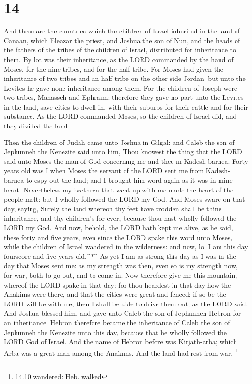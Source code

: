 \hypertarget{section-13}{%
\section{14}\label{section-13}}

 And these are the countries which the children of Israel
inherited in the land of Canaan, which Eleazar the priest, and Joshua
the son of Nun, and the heads of the fathers of the tribes of the
children of Israel, distributed for inheritance to them.  By
lot was their inheritance, as the LORD commanded by the hand of Moses,
for the nine tribes, and for the half tribe.  For Moses had
given the inheritance of two tribes and an half tribe on the other side
Jordan: but unto the Levites he gave none inheritance among them.
 For the children of Joseph were two tribes, Manasseh and
Ephraim: therefore they gave no part unto the Levites in the land, save
cities to dwell in, with their suburbs for their cattle and for their
substance.  As the LORD commanded Moses, so the children of
Israel did, and they divided the land.

 Then the children of Judah came unto Joshua in Gilgal: and
Caleb the son of Jephunneh the Kenezite said unto him, Thou knowest the
thing that the LORD said unto Moses the man of God concerning me and
thee in Kadesh-barnea.  Forty years old was I when Moses the
servant of the LORD sent me from Kadesh-barnea to espy out the land; and
I brought him word again as it was in mine heart. 
Nevertheless my brethren that went up with me made the heart of the
people melt: but I wholly followed the LORD my God.  And
Moses sware on that day, saying, Surely the land whereon thy feet have
trodden shall be thine inheritance, and thy children's for ever, because
thou hast wholly followed the LORD my God.  And now,
behold, the LORD hath kept me alive, as he said, these forty and five
years, even since the LORD spake this word unto Moses, while the
children of Israel wandered in the wilderness: and now, lo, I am this
day fourscore and five years old.\^{}*\^{}  As yet I am as
strong this day as I was in the day that Moses sent me: as my strength
was then, even so is my strength now, for war, both to go out, and to
come in.  Now therefore give me this mountain, whereof the
LORD spake in that day; for thou heardest in that day how the Anakims
were there, and that the cities were great and fenced: if so be the LORD
will be with me, then I shall be able to drive them out, as the LORD
said.  And Joshua blessed him, and gave unto Caleb the son
of Jephunneh Hebron for an inheritance.  Hebron therefore
became the inheritance of Caleb the son of Jephunneh the Kenezite unto
this day, because that he wholly followed the LORD God of Israel.
 And the name of Hebron before was Kirjath-arba; which Arba
was a great man among the Anakims. And the land had rest from war.
\footnote{14.10 wandered: Heb. walked}

